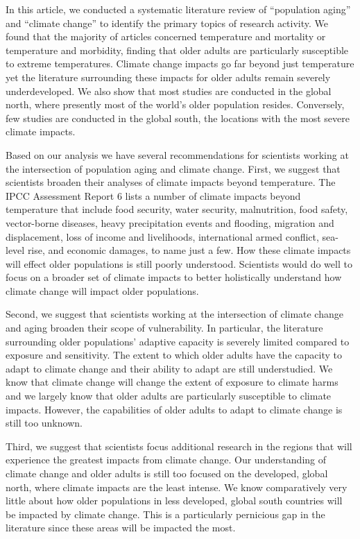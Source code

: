 \documentclass[12pt]{article}
\begin{document}
In this article, we conducted a systematic literature review of
``population aging'' and ``climate change'' to identify the primary
topics of research activity. We found that the majority of articles
concerned temperature and mortality or temperature and morbidity,
finding that older adults are particularly susceptible to extreme
temperatures. Climate change impacts go far beyond just temperature yet
the literature surrounding these impacts for older adults remain
severely underdeveloped. We also show that most studies are conducted in
the global north, where presently most of the world's older population
resides. Conversely, few studies are conducted in the global south, the
locations with the most severe climate impacts.

Based on our analysis we have several recommendations for scientists
working at the intersection of population aging and climate change.
First, we suggest that scientists broaden their analyses of climate
impacts beyond temperature. The IPCC Assessment Report 6 lists a number
of climate impacts beyond temperature that include food security, water
security, malnutrition, food safety, vector-borne diseases, heavy
precipitation events and flooding, migration and displacement, loss of
income and livelihoods, international armed conflict, sea-level rise,
and economic damages, to name just a few. How these climate impacts will
effect older populations is still poorly understood. Scientists would do
well to focus on a broader set of climate impacts to better holistically
understand how climate change will impact older populations.

Second, we suggest that scientists working at the intersection of
climate change and aging broaden their scope of vulnerability. In
particular, the literature surrounding older populations' adaptive
capacity is severely limited compared to exposure and sensitivity. The
extent to which older adults have the capacity to adapt to climate
change and their ability to adapt are still understudied. We know that
climate change will change the extent of exposure to climate harms and
we largely know that older adults are particularly susceptible to
climate impacts. However, the capabilities of older adults to adapt to
climate change is still too unknown.

Third, we suggest that scientists focus additional research in the
regions that will experience the greatest impacts from climate change.
Our understanding of climate change and older adults is still too
focused on the developed, global north, where climate impacts are the
least intense. We know comparatively very little about how older
populations in less developed, global south countries will be impacted
by climate change. This is a particularly pernicious gap in the
literature since these areas will be impacted the most.
\end{document}
